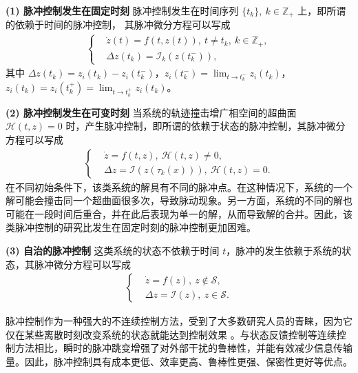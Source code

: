 \textbf{(1) 脉冲控制发生在固定时刻} 脉冲控制发生在时间序列 $\{t_k\},\  k\in\mathbb{Z}_+$ 上，即所谓的依赖于时间的脉冲控制， 其脉冲微分方程可以写成 
\begin{align*} \left\{
\begin{aligned} 
&\dot{z}(t)=f(t,z(t)),\ t\neq t_k,\ k\in \mathbb{Z}_+,\\
&\Delta z(t_k)=\mathcal{I}_k (z(t^-_k)),  
\end{aligned}
\right.
\end{align*}
其中 $\Delta z(t_k)=z_i(t_k)-z_i(t^-_k)$，$ z_i(t^-_k)=\lim_{t\rightarrow t^-_k}z_i(t_k)$， $z_i(t_k)=z_i(t^+_k)=\lim_{t\rightarrow t^+_k}z_i(t_k)$。

\textbf{(2) 脉冲控制发生在可变时刻}  \cite{yang2017synchronization115} 当系统的轨迹撞击增广相空间的超曲面  
$\mathcal{H}(t,z)=0$
时，产生脉冲控制，即所谓的依赖于状态的脉冲控制，其脉冲微分方程可以写成 
\begin{align*} \left\{
\begin{aligned} 
&\dot{z}=f(t,z ),\ \mathcal{H}(t,z)\neq 0,\\
&\Delta z =\mathcal{I}(z(\tau_k(x))),\ \mathcal{H}(t,z)=0.
\end{aligned}
\right.
\end{align*}
在不同初始条件下，该类系统的解具有不同的脉冲点。在这种情况下，系统的一个解可能会撞击同一个超曲面很多次，导致脉动现象。另一方面，系统的不同的解也可能在一段时间后重合，并在此后表现为单一的解，从而导致解的合并。因此，该类脉冲控制的研究比发生在固定时刻的脉冲控制更加困难。
 
\textbf{(3) 自治的脉冲控制} \cite{goedel2012hybrid}  这类系统的状态不依赖于时间 $t$，脉冲的发生依赖于系统的状态，其脉冲微分方程可以写成
\begin{align*} \left\{
\begin{aligned} 
&\dot{z} =f(z),\ z\notin \mathcal{S},\\
&\Delta z =\mathcal{I}(z),\  z\in \mathcal{S}.
\end{aligned}
\right.
\end{align*}
 
 
脉冲控制作为一种强大的不连续控制方法，受到了大多数研究人员的青睐，因为它仅在某些离散时刻改变系统的状态就能达到控制效果 \cite{2020Synchronization38,tang2015leader346}。与状态反馈控制等连续控制方法相比，瞬时的脉冲跳变增强了对外部干扰的鲁棒性，并能有效减少信息传输量。因此，脉冲控制具有成本更低、效率更高、鲁棒性更强、保密性更好等优点。 
